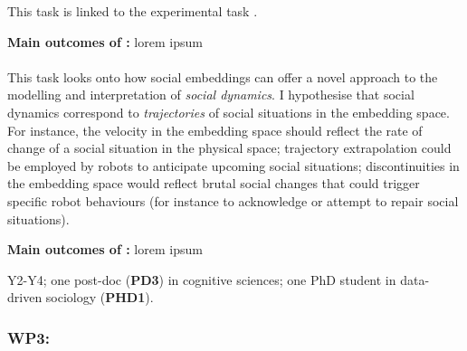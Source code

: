 This task is linked to the experimental task \tDD.

\begin{framed}
    {\noindent\bf Main outcomes of \tBB:} lorem ipsum 
\end{framed}

\paragraph{\TBC}

This task looks onto how social embeddings can offer a novel approach to the
modelling and interpretation of \emph{social dynamics}. I hypothesise that
social dynamics correspond to \emph{trajectories} of social situations in the
embedding space.  For instance, the velocity in the embedding space should
reflect the rate of change of a social situation in the physical space;
trajectory extrapolation could be employed by robots to anticipate upcoming
social situations; discontinuities in the embedding space would reflect brutal
social changes that could trigger specific robot behaviours (for instance to
acknowledge or attempt to repair social situations).  


\begin{framed}
    {\noindent\bf Main outcomes of \tBC:} lorem ipsum 
\end{framed}


\begin{framed}
     Y2-Y4; one post-doc ({\bf PD3}) in cognitive
    sciences; one PhD student in data-driven sociology ({\bf PHD1}).
\end{framed}





\subsubsection{WP3: \textbf{\WPC}}

